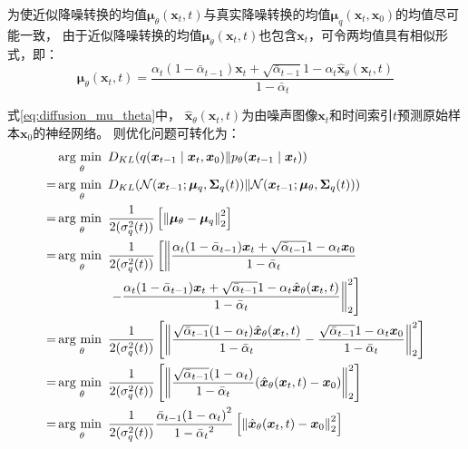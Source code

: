 为使近似降噪转换的均值{$\bm{\mu}_{\theta}(\bm{x}_{t},t)$}与真实降噪转换的均值{$\bm{\mu}_{q}(\bm{x}_{t},\bm{x}_{0})$}的均值尽可能一致，
由于近似降噪转换的均值{$\bm{\mu}_{\theta}(\bm{x}_{t},t)$}也包含{$\bm{x}_{t}$}，可令两均值具有相似形式，即：
\begin{equation}
    \label{eq:diffusion_mu_theta}
    \bm{\mu}_{\theta}(\bm{x}_{t},t)=\frac{\alpha_{t}(1-\bar{\alpha}_{t-1})\bm{x}_{t} + \sqrt{\bar{\alpha}_{t-1}}1-\alpha_{t}\hat{\bm{x}}_{\theta}(\bm{x}_{t},t)}{  1-\bar{\alpha}_{t}}
\end{equation}

式{\ref{eq:diffusion_mu_theta}}中，
{$\hat{\bm{x}}_{\theta}(\bm{x}_{t},t)$}为由噪声图像{$\bm{x}_{t}$}和时间索引{$t$}预测原始样本{$\bm{x}_{0}$}的神经网络。
则优化问题可转化为：
\begin{align}
    &\argmin_{\theta} D_{KL}(q(\bm{x}_{t-1}\mid \bm{x}_{t},\bm{x}_{0}) \Vert p_{\theta}(\bm{x}_{t-1}\mid \bm{x}_{t})  )
    \\=& \argmin_{\theta}  D_{KL}(\mathcal{N}(\bm{x}_{t-1};\bm{\mu}_{q},\bm{\Sigma}_{q}(t))\Vert \mathcal{N}(\bm{x}_{t-1};\bm{\mu}_{\theta},\bm{\Sigma}_{q}(t)))
    \\=& \argmin_{\theta}  \frac{1}{2(\sigma_{q}^{2}(t))}\left[ {\Vert \bm{\mu}_{\theta}-\bm{\mu}_{q} \Vert}_{2}^{2}  \right] 
    \\=& \argmin_{\theta}  \frac{1}{2(\sigma_{q}^{2}(t))}\left[ \left\Vert 
    \frac{\alpha_{t}(1-\bar{\alpha}_{t-1})\bm{x}_{t} + \sqrt{\bar{\alpha}_{t-1}}1-\alpha_{t}\bm{x}_{0}}{  1-\bar{\alpha}_{t}}
    \right. \right. \\ & \qquad \qquad \left. \left. -\frac{\alpha_{t}(1-\bar{\alpha}_{t-1})\bm{x}_{t} + \sqrt{\bar{\alpha}_{t-1}}1-\alpha_{t}\hat{\bm{x}}_{\theta}(\bm{x}_{t},t)}{  1-\bar{\alpha}_{t}}
    \right\Vert_{2}^{2} \right]
    \\=& \argmin_{\theta}  \frac{1}{2(\sigma_{q}^{2}(t))}\left[ {\left\Vert 
    \frac{ \sqrt{\bar{\alpha}_{t-1}}(1-\alpha_{t})\hat{\bm{x}}_{\theta}(\bm{x}_{t}, t)}{  1-\bar{\alpha}_{t}}
    -\frac{\sqrt{\bar{\alpha}_{t-1}}1-\alpha_{t}\bm{x}_{0}}{  1-\bar{\alpha}_{t}}
    \right\Vert}_{2}^{2} \right]
    \\=& \argmin_{\theta}  \frac{1}{2(\sigma_{q}^{2}(t))}\left[ {\left\Vert 
    \frac{ \sqrt{\bar{\alpha}_{t-1}}(1-\alpha_{t})}{  1-\bar{\alpha}_{t}}
    (\hat{\bm{x}}_{\theta}(\bm{x}_{t}, t)-\bm{x}_{0})
    \right\Vert}_{2}^{2} \right]
    \\=& \argmin_{\theta}  \frac{1}{2(\sigma_{q}^{2}(t))}
    \frac{\bar{\alpha}_{t-1}{(1-\alpha_{t})}^{2}}{{ 1-\bar{\alpha}_{t}}^{2}}\left[ {\left\Vert
    \hat{\bm{x}}_{\theta}(\bm{x}_{t}, t)-\bm{x}_{0}
    \right\Vert}_{2}^{2}\right] \label{eq:diffusion_optimize}
\end{align}

